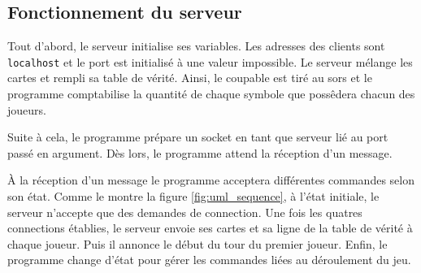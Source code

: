 \subsection{Fonctionnement du serveur}

Tout d'abord, le serveur initialise ses variables. Les adresses des clients sont
\verb|localhost| et le port est initialisé à une valeur impossible. Le serveur
mélange les cartes et rempli sa table de vérité. Ainsi, le coupable est tiré au
sors et le programme comptabilise la quantité de chaque symbole que possêdera
chacun des joueurs.

Suite à cela, le programme prépare un socket en tant que serveur lié au port
passé en argument. Dès lors, le programme attend la réception d'un message.

À la réception d'un message le programme acceptera différentes commandes selon
son état. Comme le montre la figure \ref{fig:uml_sequence}, à l'état initiale,
le serveur n'accepte que des demandes de connection. Une fois les quatres
connections établies, le serveur envoie ses cartes et sa ligne de la table de
vérité à chaque joueur. Puis il annonce le début du tour du premier joueur.
Enfin, le programme change d'état pour gérer les commandes liées au déroulement
du jeu.
